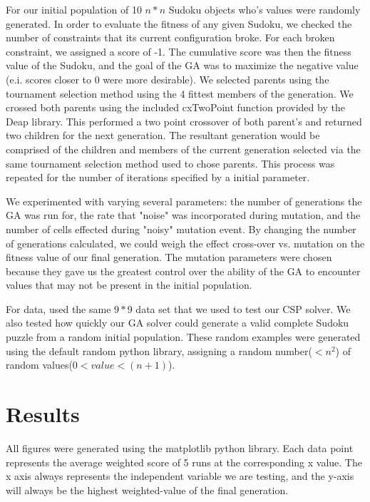 \documentclass[12pt, conference]{IEEEtran}
\begin{document}
\par
For our initial population of 10 $n*n$ Sudoku objects who's values were randomly generated.
In order to evaluate the fitness of any given Sudoku, we checked the number of constraints that its current configuration broke.
For each broken constraint, we assigned a score of -1.
The cumulative score was then the fitness value of the Sudoku, and the goal of the GA was to maximize the negative value (e.i. scores closer to 0 were more desirable).
We selected parents using the tournament selection method using the 4 fittest members of the generation.
We crossed both parents using the included cxTwoPoint function provided by the Deap library.
This performed a two point crossover of both parent's and returned two children for the next generation.
The resultant generation would be comprised of the children and members of the current generation selected via the same tournament selection method used to chose parents.
This process was repeated for the number of iterations specified by a initial parameter.

\par
We experimented with varying several parameters: the number of generations the GA was run for, the rate that "noise" was incorporated during mutation, and the number of cells effected during "noisy" mutation event.
By changing the number of generations calculated, we could weigh the effect cross-over vs. mutation on the fitness value of our final generation.
The mutation parameters were chosen because they gave us the greatest control over the ability of the GA to encounter values that may not be present in the initial population.

\par
For data, used the same $9*9$ data set that we used to test our CSP solver.
We also tested how quickly our GA solver could generate a valid complete Sudoku puzzle from a random initial population.
These random examples were generated using the default random python library, assigning a random number($<n^2$) of random values($0<value<(n+1)$).

\section{Results}
All figures were generated using the matplotlib python library. Each data point represents the average weighted score of 5 runs at the corresponding x value.
The x axis always represents the independent variable we are testing, and the y-axis will always be the highest weighted-value of the final generation.
\end{document}
